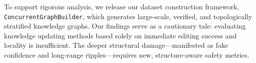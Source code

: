 To support rigorous analysis, we release our dataset construction framework, \texttt{ConcurrentGraphBuilder}, which generates large-scale, verified, and topologically stratified knowledge graphs. Our findings serve as a cautionary tale: evaluating knowledge updating methods based solely on immediate editing success and locality is insufficient. The deeper structural damage---manifested as fake confidence and long-range ripples---requires new, structure-aware safety metrics.